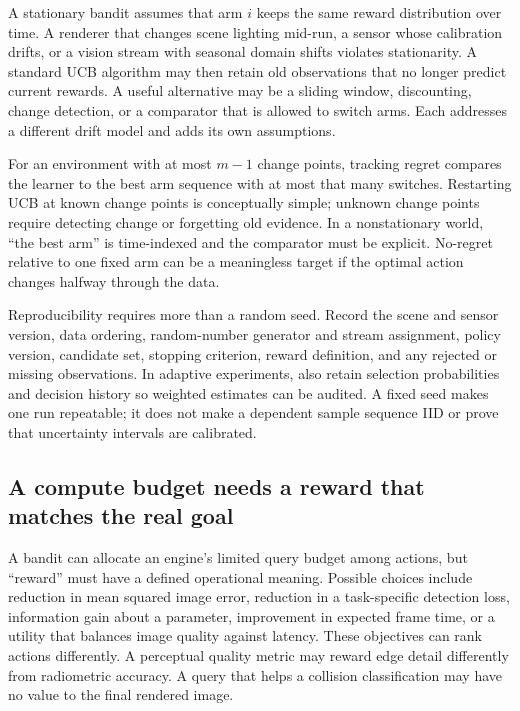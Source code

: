 \hypertarget{03-visual-computing-i-ch012-stationarity-and-reproducibility-are-part-of-the-experiment}{}

A stationary bandit assumes that arm \(i\) keeps the same reward distribution over time. A renderer that changes scene lighting mid-run, a sensor whose calibration drifts, or a vision stream with seasonal domain shifts violates stationarity. A standard UCB algorithm may then retain old observations that no longer predict current rewards. A useful alternative may be a sliding window, discounting, change detection, or a comparator that is allowed to switch arms. Each addresses a different drift model and adds its own assumptions.

For an environment with at most \(m-1\) change points, tracking regret compares the learner to the best arm sequence with at most that many switches. Restarting UCB at known change points is conceptually simple; unknown change points require detecting change or forgetting old evidence. In a nonstationary world, ``the best arm'' is time-indexed and the comparator must be explicit. No-regret relative to one fixed arm can be a meaningless target if the optimal action changes halfway through the data.

Reproducibility requires more than a random seed. Record the scene and sensor version, data ordering, random-number generator and stream assignment, policy version, candidate set, stopping criterion, reward definition, and any rejected or missing observations. In adaptive experiments, also retain selection probabilities and decision history so weighted estimates can be audited. A fixed seed makes one run repeatable; it does not make a dependent sample sequence IID or prove that uncertainty intervals are calibrated.

\subsection{A compute budget needs a reward that matches the real goal}\label{03-visual-computing-i-ch012-a-compute-budget-needs-a-reward-that-matches-the-real-goal}

\hypertarget{03-visual-computing-i-ch012-a-compute-budget-needs-a-reward-that-matches-the-real-goal}{}

A bandit can allocate an engine's limited query budget among actions, but ``reward'' must have a defined operational meaning. Possible choices include reduction in mean squared image error, reduction in a task-specific detection loss, information gain about a parameter, improvement in expected frame time, or a utility that balances image quality against latency. These objectives can rank actions differently. A perceptual quality metric may reward edge detail differently from radiometric accuracy. A query that helps a collision classification may have no value to the final rendered image.

